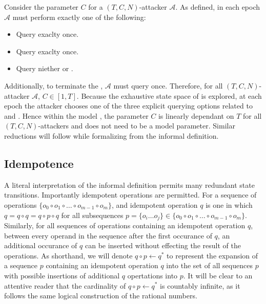 Consider the parameter \(C\) for a \((T, C, N)\)-attacker \(\mathcal{A}\).
As defined, in each epoch \(\mathcal{A}\) must perform exactly one of the following:

\begin{itemize}
  \item Query  exaclty once.
  \item Query   exaclty once.
  \item Query niether  or .
\end{itemize}

Additionally, to terminate the \CGKAsec, \(\mathcal{A}\) must query  once.
Therefore, for all \((T, C, N)\)-attacker \(\mathcal{A}\), \(C \in [1, T]\).
Because the exhaustive state space of is explored, at each epoch the attacker chooses one of the three explicit querying options related to  and .
Hence within the model , the parameter \(C\) is linearly dependant on \(T\) for all \((T, C, N)\)-attackers and does not need to be a model parameter.
Similar reductions will follow while formalizing  from the informal \CGKAsec definition.


\hypertarget{idempotence}{%
\subsection{Idempotence}\label{idempotence}}

A literal interpretation of the informal \CGKAsec definition permits many redundant state transitions.
Importantly idempotent operations are permitted.
For a sequence of operations \( \{ o_0 \circ o_{1} \circ \ldots \circ o_{m-1} \circ o_{m} \} \), and idempotent operation \(q\) is one in which \(q = q \circ q = q \circ p \circ q\) for all subsequences \(p = \{o_i \ldots o_j \} \in \{ o_0 \circ o_{1} \circ \ldots \circ o_{m-1} \circ o_{m} \} \).
Similarly, for all sequences of operations containing an idempotent operation \(q\), between every operand in the sequence after the first occurance of \(q\), an additional occurance of \(q\) can be inserted without effecting the result of the operations.
As shorthand, we will denote \(q \circ p \gets q^{*}\) to represent the expansion of a sequence \(p\) containing an idempotent operation \(q\) into the set of all sequences \(p\) with possible insertions of additional \(q\) opertations into \(p\).
It will be clear to an attentive reader that the cardinality of \(q \circ p \gets q^{*}\) is countably infinite, as it follows the same logical construction of the rational numbers.

